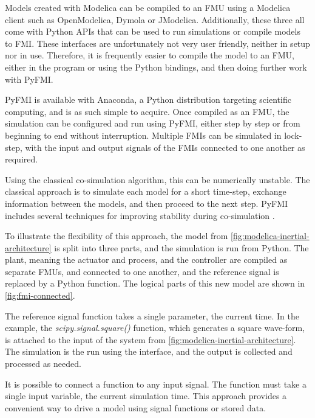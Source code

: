 \documentclass[\rootfolder/main.tex]{subfiles}
\begin{document}
Models created with Modelica can be compiled to an FMU using a Modelica client such as OpenModelica, Dymola or JModelica.
Additionally, these three all come with Python APIs that can be used to run simulations or compile models to FMI.
These interfaces are unfortunately not very user friendly, neither in setup nor in use.
Therefore, it is frequently easier to compile the model to an FMU, either in the program or using the Python bindings, and then doing further work with PyFMI.

PyFMI is available with Anaconda, a Python distribution targeting scientific computing, and is as such simple to acquire.
Once compiled as an FMU, the simulation can be configured and run using PyFMI, either step by step or from beginning to end without interruption.
Multiple FMIs can be simulated in lock-step, with the input and output signals of the FMIs connected to one another as required.

Using the classical co-simulation algorithm, this can be numerically unstable.
The classical approach is to simulate each model for a short time-step, exchange information between the models, and then proceed to the next step.
PyFMI includes several techniques for improving stability during co-simulation \cite{Andersson2016}.

To illustrate the flexibility of this approach, the model from \cref{fig:modelica-inertial-architecture} is split into three parts, and the simulation is run from Python.
The plant, meaning the actuator and process, and the controller are compiled as separate FMUs, and connected to one another, and the reference signal is replaced by a Python function.
The logical parts of this new model are shown in \cref{fig:fmi-connected}.

The reference signal function takes a single parameter, the current time.
In the example, the \emph{scipy.signal.square()} function, which generates a square wave-form, is attached to the input of the system from \cref{fig:modelica-inertial-architecture}.
The simulation is the run using the interface, and the output is collected and processed as needed.

It is possible to connect a function to any input signal.
The function must take a single input variable, the current simulation time.
This approach provides a convenient way to drive a model using signal functions or stored data.
\end{document}
